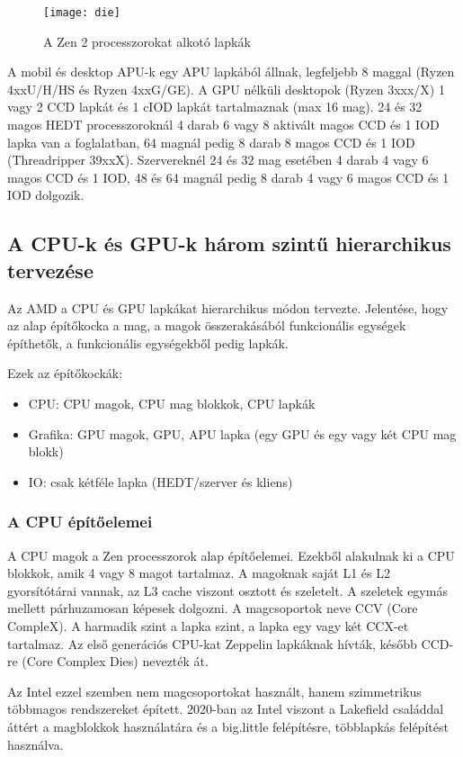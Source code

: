 \begin{figure}[H]
    \texttt{[image: die]}
    \centering
    \caption{A Zen 2 processzorokat alkotó lapkák}
    \label{fig:die}
\end{figure}

A mobil és desktop APU-k egy APU lapkából állnak, legfeljebb 8 maggal (Ryzen 4xxU/H/HS és Ryzen 4xxG/GE).
A GPU nélküli desktopok (Ryzen 3xxx/X) 1 vagy 2 CCD lapkát és 1 cIOD lapkát tartalmaznak (max 16 mag).
24 és 32 magos HEDT processzoroknál 4 darab 6 vagy 8 aktivált magos CCD és 1 IOD lapka van a foglalatban, 64 magnál pedig 8 darab 8 magos CCD és 1 IOD (Threadripper 39xxX).
Szervereknél 24 és 32 mag esetében 4 darab 4 vagy 6 magos CCD és 1 IOD, 48 és 64 magnál pedig 8 darab 4 vagy 6 magos CCD és 1 IOD dolgozik.

\subsection{A CPU-k és GPU-k három szintű hierarchikus tervezése}
Az AMD a CPU és GPU lapkákat hierarchikus módon tervezte.
Jelentése, hogy az alap építőkocka a mag, a magok összerakásából funkcionális egységek építhetők, a funkcionális egységekből pedig lapkák.

Ezek az építőkockák:
\begin{itemize}
    \item CPU: CPU magok, CPU mag blokkok, CPU lapkák
    \item Grafika: GPU magok, GPU, APU lapka (egy GPU és egy vagy két CPU mag blokk)
    \item IO: csak kétféle lapka (HEDT/szerver és kliens)
\end{itemize}

\subsubsection{A CPU építőelemei}
A CPU magok a Zen processzorok alap építőelemei.
Ezekből alakulnak ki a CPU blokkok, amik 4 vagy 8 magot tartalmaz.
A magoknak saját L1 és L2 gyorsítótárai vannak, az L3 cache viszont osztott és szeletelt.
A szeletek egymás mellett párhuzamosan képesek dolgozni.
A magcsoportok neve CCV (Core CompleX).
A harmadik szint a lapka szint, a lapka egy vagy két CCX-et tartalmaz.
Az első generációs CPU-kat Zeppelin lapkáknak hívták, később CCD-re (Core Complex Dies) nevezték át.

Az Intel ezzel szemben nem magcsoportokat használt, hanem szimmetrikus többmagos rendszereket épített.
2020-ban az Intel viszont a Lakefield családdal áttért a magblokkok használatára és a big.little felépítésre, többlapkás felépítést használva.

